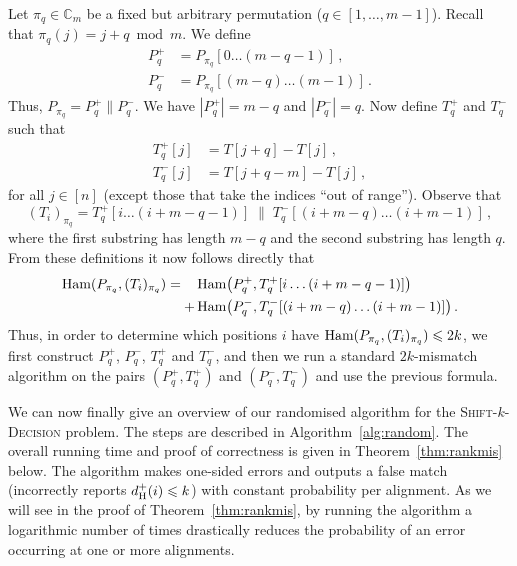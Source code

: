 \documentclass[11pt]{article}
\renewcommand{\leq}{\leqslant}
\newcommand{\ham}{\ensuremath{\textup{Ham}}}
\newcommand{\concat}{\|}
\newcommand{\upto}{\ldots}
\newcommand{\Fam}{\ensuremath{\mathbb{C}_m}}
\newcommand{\DsHam}{\ensuremath{d_\textup{H}^+}}
\newcommand{\skDecision}{\textsc{Shift-$k$-Decision}\xspace}
\newcommand{\dHam}{\DsHam}
\theoremstyle{plain}
\theoremstyle{definition}
\begin{document}
Let $\pi_q\in \Fam$ be a fixed but arbitrary permutation ($q\in [1,\dots,m-1]$). Recall that $\pi_q(j) = j + q \bmod m$. We define
\begin{align*}
    P^+_q &= P_{\pi_q}[0\upto (m-q-1)] \,, \\
    P^-_q &= P_{\pi_q}[(m-q)\upto (m-1)] \,.
\end{align*}
Thus, $P_{\pi_q} = P^+_q\concat P^-_q$. We have $|P^+_q|=m-q$ and $|P^-_q|=q$. Now define $T^+_q$ and $T^-_q$ such that
\begin{align*}
    T^+_q[j] &= T[j+q] - T[j] \,, \\
    T^-_q[j] &= T[j+q-m] - T[j] \,,
\end{align*}
for all $j\in [n]$ (except those that take the indices ``out of range''). Observe that
\begin{equation*}
    (T_i)_{\pi_q} = T^+_q[i\upto (i+m-q-1)] \;\concat\; T^-_q[(i+m-q)\upto (i+m-1)] \,,
\end{equation*}
where the first substring has length $m-q$ and the second substring has length $q$. From these definitions it now follows directly that
\begin{align}
    \label{eq:hamconcat}
    \ham(P_{\pi_q},(T_i)_{\pi_q}) = \hspace{1em}
        &\,\ham\big(P^+_q,T^+_q[i\upto (i+m-q-1)]\big) \\
        + &\,\ham\big(P^-_q,T^-_q[(i+m-q)\upto (i+m-1)]\big) \,. \notag
\end{align}
Thus, in order to determine which positions $i$ have $\ham(P_{\pi_q},(T_i)_{\pi_q})\leq 2k$, we first construct $P^+_q$, $P^-_q$, $T^+_q$ and $T^-_q$, and then we run a standard $2k$-mismatch algorithm on the pairs $(P^+_q,T^+_q)$ and $(P^-_q,T^-_q)$ and use the previous formula.

We can now finally give an overview of our randomised algorithm for the \skDecision problem. The steps are described in Algorithm~\ref{alg:random}. The overall running time and proof of correctness is given in Theorem~\ref{thm:rankmis} below. The algorithm makes one-sided errors and outputs a false match (incorrectly reports $\dHam(i) \leq k$) with constant probability per alignment. As we will see in the proof of Theorem~\ref{thm:rankmis}, by running the algorithm a logarithmic number of times drastically reduces the probability of an error occurring at one or more alignments.
\end{document}
